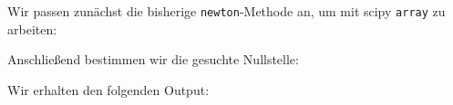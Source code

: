 \section{}

Wir passen zunächst die bisherige \texttt{newton}-Methode an, um mit scipy \texttt{array} zu arbeiten:



Anschließend bestimmen wir die gesuchte Nullstelle:



Wir erhalten den folgenden Output:

